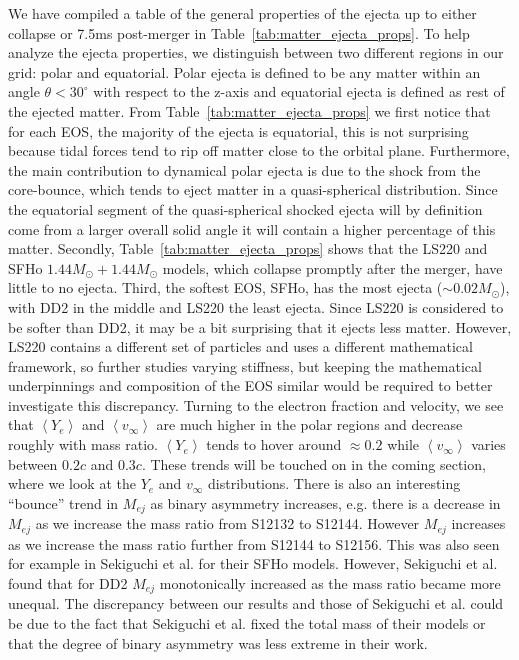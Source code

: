 We have compiled a table of the general properties of the ejecta up to either collapse or 7.5ms post-merger in Table~\ref{tab:matter_ejecta_props}. To help analyze the ejecta properties, we distinguish between two different regions in our grid: polar and equatorial.  Polar ejecta
is defined to be any matter within an angle $\theta < 30^\circ$ with respect to the z-axis and equatorial ejecta is defined as rest of the
ejected matter. From Table~\ref{tab:matter_ejecta_props} we first notice that for each EOS, the majority of the ejecta is equatorial, this is not surprising because tidal forces tend to rip off matter close to the orbital plane. Furthermore, the main contribution to dynamical polar ejecta is due to the shock from the core-bounce, which tends to eject matter in a quasi-spherical distribution. Since the equatorial segment of the quasi-spherical shocked ejecta will by definition come from a larger overall solid angle it will contain a higher percentage of this matter. Secondly, Table~\ref{tab:matter_ejecta_props} shows that the LS220 and SFHo $1.44M_\odot + 1.44M_\odot$ models, which collapse promptly after the merger, have little to no ejecta. Third, the softest EOS, SFHo, has the most ejecta ($\sim 0.02M_\odot$), with DD2 in the middle and LS220 the least ejecta. Since LS220 is considered to be softer than DD2, it may be a bit surprising that it ejects less matter. However, LS220 contains a different set of particles and uses a different mathematical framework, so further studies varying stiffness, but keeping the mathematical underpinnings and composition of the EOS similar would be required to better investigate this discrepancy. 
Turning to the electron fraction and velocity, we see that $\left<Y_e\right>$ and
$\left<v_\infty\right>$ are much higher in the polar regions and decrease roughly with mass ratio. $\left<Y_e\right>$ tends to hover around $\approx 0.2$ while $\left<v_\infty\right>$ varies between $0.2c$ and $0.3c$. These trends will be touched on in the coming section, where we look at the $Y_e$ and $v_\infty$ distributions. There is also an interesting ``bounce'' trend in $M_{ej}$ as binary asymmetry increases, e.g. there is a decrease in $M_{ej}$ as we increase the mass ratio from S12132 to S12144. However $M_{ej}$ increases as we increase the mass ratio further from S12144 to S12156. This was also seen for example in Sekiguchi et al. \cite{sekiguchi2016dynamical} for their SFHo models. However, Sekiguchi et al. found that for DD2 $M_{ej}$ monotonically increased as the mass ratio became more unequal. The discrepancy between our results and those of Sekiguchi et al. could be due to the fact that Sekiguchi et al. fixed the total mass of their models or that the degree of binary asymmetry was less extreme in their work.

